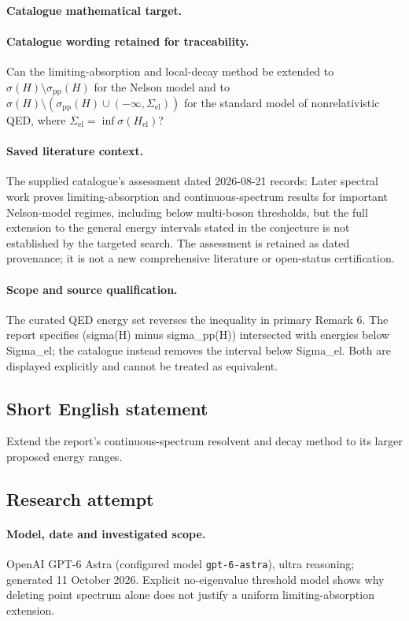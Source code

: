 \documentclass[11pt]{article}
\begin{document}
\paragraph{Catalogue mathematical target.}
\paragraph{Catalogue wording retained for traceability.}
Can the limiting-absorption and local-decay method be extended to $\sigma(H)\setminus\sigma_{\mathrm{pp}}(H)$ for the Nelson model and to $\sigma(H)\setminus(\sigma_{\mathrm{pp}}(H)\cup(-\infty,\Sigma_{\mathrm{el}}))$ for the standard model of nonrelativistic QED, where $\Sigma_{\mathrm{el}}=\inf\sigma(H_{\mathrm{el}})$?

\paragraph{Saved literature context.} The supplied catalogue's assessment dated 2026-08-21 records: Later spectral work proves limiting-absorption and continuous-spectrum results for important Nelson-model regimes, including below multi-boson thresholds, but the full extension to the general energy intervals stated in the conjecture is not established by the targeted search. The assessment is retained as dated provenance; it is not a new comprehensive literature or open-status certification.
\paragraph{Scope and source qualification.}The curated QED energy set reverses the inequality in primary Remark 6. The report specifies (sigma(H) minus sigma_pp(H)) intersected with energies below Sigma_el; the catalogue instead removes the interval below Sigma_el. Both are displayed explicitly and cannot be treated as equivalent.
\subsection{Short English statement}
Extend the report's continuous-spectrum resolvent and decay method to its larger proposed energy ranges.
\subsection{Research attempt}
\paragraph{Model, date and investigated scope.}
OpenAI GPT-6 Astra (configured model \texttt{gpt-6-astra}), ultra reasoning; generated 11 October 2026. Explicit no-eigenvalue threshold model shows why deleting point spectrum alone does not justify a uniform limiting-absorption extension.
\end{document}
